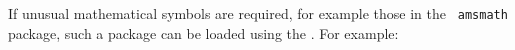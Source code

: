 

\begin{center}
\end{center}

If unusual mathematical symbols are required, for example those in the {\tt
amsmath} package, such a package
can be loaded using the . For example:



\begin{center}
\end{center}

